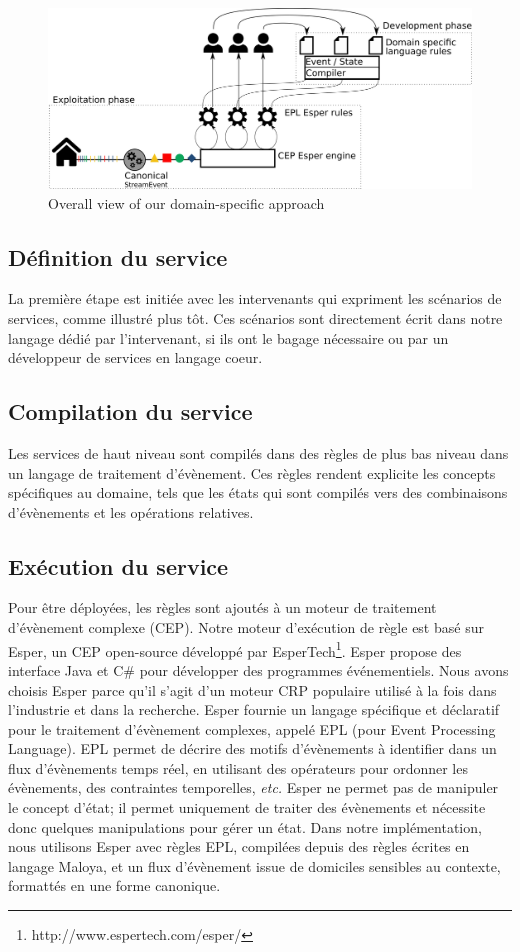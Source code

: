 \begin{figure}[h]
\centering
  \includegraphics[scale=0.2]{gfx/approach}
\caption{Overall view of our domain-specific approach}
\label{fig:functionalarchi}
\end{figure}

\subsection*{Définition du service}
La première étape est initiée avec les intervenants qui expriment les scénarios de services, comme illustré plus tôt. Ces scénarios sont directement écrit dans notre langage dédié par l'intervenant, si ils ont le bagage nécessaire ou par un développeur de services en langage coeur.

\subsection*{Compilation du service}
Les services de haut niveau sont compilés dans des règles de plus bas niveau dans un langage de traitement d'évènement. Ces règles rendent explicite les concepts spécifiques au domaine, tels que les états qui sont compilés vers des combinaisons d'évènements et les opérations relatives.

\subsection*{Exécution du service}
Pour être déployées, les règles sont ajoutés à un moteur de traitement d'évènement complexe (CEP). Notre moteur d'exécution de règle est basé sur Esper, un CEP open-source développé par EsperTech\footnote{http://www.espertech.com/esper/}. Esper propose des interface Java et C\# pour développer des programmes événementiels. Nous avons choisis Esper parce qu'il s'agit d'un moteur CRP populaire utilisé à la fois dans l'industrie et dans la recherche. Esper fournie un langage spécifique et déclaratif pour le traitement d'évènement complexes, appelé EPL (pour Event Processing Language). EPL permet de décrire des motifs d'évènements à identifier dans un flux d'évènements temps réel, en utilisant des opérateurs pour ordonner les évènements, des contraintes temporelles, {\em etc.} Esper ne permet pas de manipuler le concept d'état; il permet uniquement de traiter des évènements et nécessite donc quelques manipulations pour gérer un état. Dans notre implémentation, nous utilisons Esper avec règles EPL, compilées depuis des règles écrites en langage Maloya, et un flux d'évènement issue de domiciles sensibles au contexte, formattés en une forme canonique.


